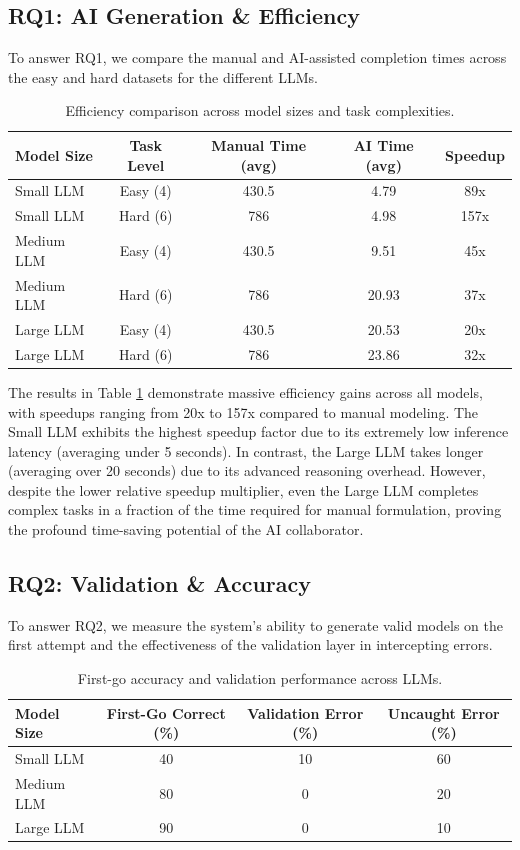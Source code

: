 \subsection{RQ1: AI Generation \& Efficiency}
To answer RQ1, we compare the manual and AI-assisted completion times across the easy and hard datasets for the different LLMs.

\begin{table}[h]
\centering
\caption{Efficiency comparison across model sizes and task complexities.}
\label{tab:rq1_efficiency}
\begin{tabular}{lcccc}
\hline
\textbf{Model Size} & \textbf{Task Level} & \textbf{Manual Time (avg)} & \textbf{AI Time (avg)} & \textbf{Speedup} \\
\hline
Small LLM & Easy (4) & 430.5 & 4.79 & 89x \\
Small LLM & Hard (6) & 786 & 4.98 & 157x  \\
Medium LLM & Easy (4) & 430.5 & 9.51 & 45x \\
Medium LLM & Hard (6) & 786 & 20.93 & 37x \\
Large LLM & Easy (4) & 430.5 & 20.53 & 20x \\
Large LLM & Hard (6) & 786 & 23.86 & 32x \\
\hline
\end{tabular}
\end{table}

The results in Table \ref{tab:rq1_efficiency} demonstrate massive efficiency gains across all models, with speedups ranging from 20x to 157x compared to manual modeling. The Small LLM exhibits the highest speedup factor due to its extremely low inference latency (averaging under 5 seconds). In contrast, the Large LLM takes longer (averaging over 20 seconds) due to its advanced reasoning overhead. However, despite the lower relative speedup multiplier, even the Large LLM completes complex tasks in a fraction of the time required for manual formulation, proving the profound time-saving potential of the AI collaborator.


\subsection{RQ2: Validation \& Accuracy}
To answer RQ2, we measure the system's ability to generate valid models on the first attempt and the effectiveness of the validation layer in intercepting errors.

\begin{table}[h]
\centering
\caption{First-go accuracy and validation performance across LLMs.}
\label{tab:rq2_accuracy}
\begin{tabular}{lccc}
\hline
\textbf{Model Size} & \textbf{First-Go Correct (\%)} & \textbf{Validation Error (\%)} & \textbf{Uncaught Error (\%)} \\
\hline
Small LLM & 40 & 10 & 60 \\
Medium LLM & 80 & 0 & 20 \\
Large LLM & 90 & 0 & 10 \\
\hline
\end{tabular}
\end{table}

